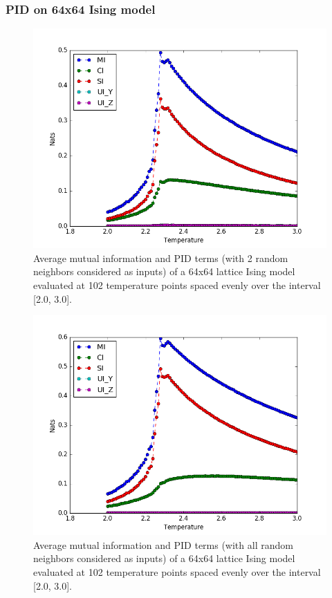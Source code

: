 \documentclass[12pt]{article}
\begin{document}
\subsubsection{PID on 64x64 Ising model}

\begin{figure} [h!]
\begin{center}
\includegraphics[width=.8\textwidth]{ising-64-pid-2-nbs}
\caption{Average mutual information and PID terms (with 2 random neighbors considered as inputs) of a 64x64 lattice Ising model evaluated at 102 temperature points spaced evenly over the interval [2.0, 3.0].}
\label{fig:ising-64-pid-2-nbs}
\end{center}
\end{figure}

\begin{figure} [h!]
\begin{center}
\includegraphics[width=.8\textwidth]{ising-64-pid-4-nbs}
\caption{Average mutual information and PID terms (with all random neighbors considered as inputs) of a 64x64 lattice Ising model evaluated at 102 temperature points spaced evenly over the interval [2.0, 3.0].}
\label{fig:ising-64-pid-4-nbs}
\end{center}
\end{figure}
\end{document}
